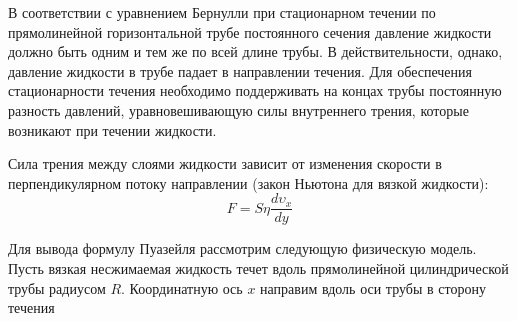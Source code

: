 \documentclass[a4paper,12pt]{article}
\theoremstyle{plain} %
\theoremstyle{definition} %
\theoremstyle{remark} %
\begin{document}
В соответствии с уравнением Бернулли при стационарном течении по прямолинейной горизонтальной трубе постоянного сечения давление жидкости должно быть одним и тем же по всей длине трубы. В действительности, однако, давление жидкости в трубе падает в направлении течения. Для обеспечения стационарности течения необходимо поддерживать на концах трубы постоянную разность давлений, уравновешивающую силы внутреннего трения, которые возникают при течении жидкости.

Сила трения между слоями жидкости зависит от изменения скорости в перпендикулярном потоку направлении (закон Ньютона для вязкой жидкости):
\begin{equation}
F = S\eta\frac{d\upsilon_x}{dy}
\end{equation}

Для вывода формулу Пуазейля рассмотрим следующую физическую модель. Пусть вязкая несжимаемая жидкость течет вдоль прямолинейной цилиндрической трубы радиусом $R$. Координатную ось $x$ направим вдоль оси трубы в сторону течения
\end{document}
